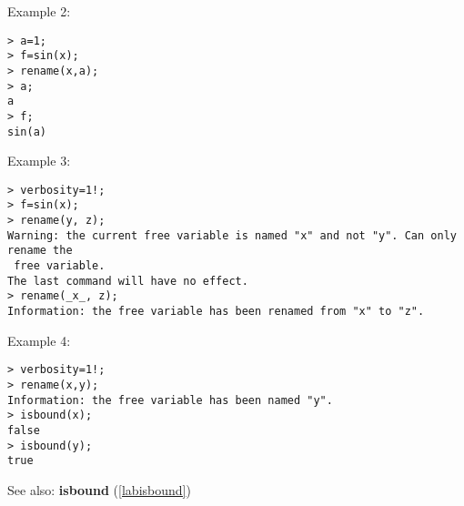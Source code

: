 \noindent Example 2: 
\begin{center}\begin{minipage}{15cm}\begin{Verbatim}[frame=single]
> a=1;
> f=sin(x);
> rename(x,a);
> a;
a
> f;
sin(a)
\end{Verbatim}
\end{minipage}\end{center}
\noindent Example 3: 
\begin{center}\begin{minipage}{15cm}\begin{Verbatim}[frame=single]
> verbosity=1!;
> f=sin(x);
> rename(y, z);
Warning: the current free variable is named "x" and not "y". Can only rename the
 free variable.
The last command will have no effect.
> rename(_x_, z);
Information: the free variable has been renamed from "x" to "z".
\end{Verbatim}
\end{minipage}\end{center}
\noindent Example 4: 
\begin{center}\begin{minipage}{15cm}\begin{Verbatim}[frame=single]
> verbosity=1!;
> rename(x,y);
Information: the free variable has been named "y".
> isbound(x);
false
> isbound(y);
true
\end{Verbatim}
\end{minipage}\end{center}
See also: \textbf{isbound} (\ref{labisbound})
